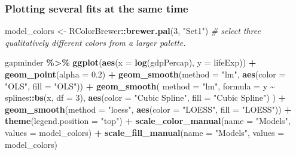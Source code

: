 \documentclass[
]{book}
\newenvironment{Shaded}{\begin{snugshade}}{\end{snugshade}}
\newcommand{\CommentTok}[1]{\textcolor[rgb]{0.56,0.35,0.01}{\textit{#1}}}
\newcommand{\DataTypeTok}[1]{\textcolor[rgb]{0.13,0.29,0.53}{#1}}
\newcommand{\DecValTok}[1]{\textcolor[rgb]{0.00,0.00,0.81}{#1}}
\newcommand{\FloatTok}[1]{\textcolor[rgb]{0.00,0.00,0.81}{#1}}
\newcommand{\KeywordTok}[1]{\textcolor[rgb]{0.13,0.29,0.53}{\textbf{#1}}}
\newcommand{\NormalTok}[1]{#1}
\newcommand{\OperatorTok}[1]{\textcolor[rgb]{0.81,0.36,0.00}{\textbf{#1}}}
\newcommand{\StringTok}[1]{\textcolor[rgb]{0.31,0.60,0.02}{#1}}
\begin{document}
\hypertarget{plotting-several-fits-at-the-same-time}{%
\subsubsection{Plotting several fits at the same time}\label{plotting-several-fits-at-the-same-time}}

\begin{Shaded}
\begin{Highlighting}[]
\NormalTok{model\_colors \textless{}{-}}\StringTok{ }\NormalTok{RColorBrewer}\OperatorTok{::}\KeywordTok{brewer.pal}\NormalTok{(}\DecValTok{3}\NormalTok{, }\StringTok{"Set1"}\NormalTok{) }\CommentTok{\# select three qualitatively different colors from a larger palette.}

\NormalTok{gapminder }\OperatorTok{\%\textgreater{}\%}
\StringTok{  }\KeywordTok{ggplot}\NormalTok{(}\KeywordTok{aes}\NormalTok{(}\DataTypeTok{x =} \KeywordTok{log}\NormalTok{(gdpPercap), }\DataTypeTok{y =}\NormalTok{ lifeExp)) }\OperatorTok{+}
\StringTok{  }\KeywordTok{geom\_point}\NormalTok{(}\DataTypeTok{alpha =} \FloatTok{0.2}\NormalTok{) }\OperatorTok{+}
\StringTok{  }\KeywordTok{geom\_smooth}\NormalTok{(}\DataTypeTok{method =} \StringTok{"lm"}\NormalTok{, }\KeywordTok{aes}\NormalTok{(}\DataTypeTok{color =} \StringTok{"OLS"}\NormalTok{, }\DataTypeTok{fill =} \StringTok{"OLS"}\NormalTok{)) }\OperatorTok{+}
\StringTok{  }\KeywordTok{geom\_smooth}\NormalTok{(}
    \DataTypeTok{method =} \StringTok{"lm"}\NormalTok{, }\DataTypeTok{formula =}\NormalTok{ y }\OperatorTok{\textasciitilde{}}\StringTok{ }\NormalTok{splines}\OperatorTok{::}\KeywordTok{bs}\NormalTok{(x, }\DataTypeTok{df =} \DecValTok{3}\NormalTok{),}
    \KeywordTok{aes}\NormalTok{(}\DataTypeTok{color =} \StringTok{"Cubic Spline"}\NormalTok{, }\DataTypeTok{fill =} \StringTok{"Cubic Spline"}\NormalTok{)}
\NormalTok{  ) }\OperatorTok{+}
\StringTok{  }\KeywordTok{geom\_smooth}\NormalTok{(}\DataTypeTok{method =} \StringTok{"loess"}\NormalTok{, }\KeywordTok{aes}\NormalTok{(}\DataTypeTok{color =} \StringTok{"LOESS"}\NormalTok{, }\DataTypeTok{fill =} \StringTok{"LOESS"}\NormalTok{)) }\OperatorTok{+}
\StringTok{  }\KeywordTok{theme}\NormalTok{(}\DataTypeTok{legend.position =} \StringTok{"top"}\NormalTok{) }\OperatorTok{+}
\StringTok{  }\KeywordTok{scale\_color\_manual}\NormalTok{(}\DataTypeTok{name =} \StringTok{"Models"}\NormalTok{, }\DataTypeTok{values =}\NormalTok{ model\_colors) }\OperatorTok{+}
\StringTok{  }\KeywordTok{scale\_fill\_manual}\NormalTok{(}\DataTypeTok{name =} \StringTok{"Models"}\NormalTok{, }\DataTypeTok{values =}\NormalTok{ model\_colors)}
\end{Highlighting}
\end{Shaded}
\end{document}
